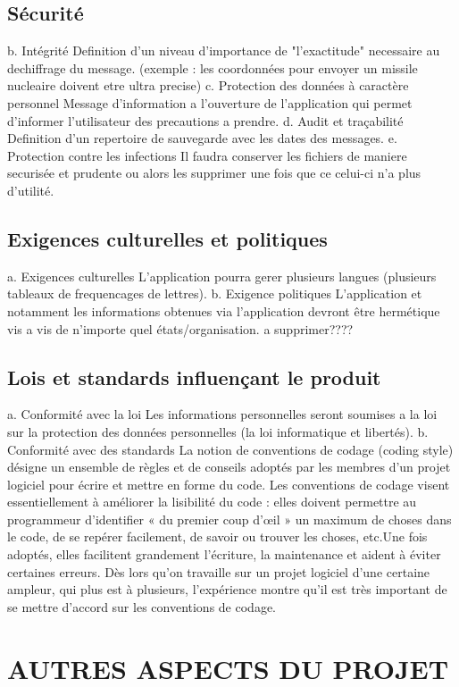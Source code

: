 \documentclass[a4]{article}
\begin{document}
		\subsection{Sécurité}
			b. Intégrité
Definition d'un niveau d'importance de "l'exactitude" necessaire au dechiffrage du message.
(exemple : les coordonnées pour envoyer un missile nucleaire doivent etre ultra precise)
			c. Protection des données à caractère personnel
Message d'information a l'ouverture de l'application qui permet d'informer l'utilisateur des precautions a prendre.
			d. Audit et traçabilité
Definition d'un repertoire de sauvegarde avec les dates des messages.
			e. Protection contre les infections
Il faudra conserver les fichiers de maniere securisée et prudente ou alors les supprimer une fois que ce celui-ci n'a plus d'utilité.
		\subsection{Exigences culturelles et politiques}
			a. Exigences culturelles
L'application pourra gerer plusieurs langues (plusieurs tableaux de frequencages de lettres).
			b. Exigence politiques
L'application et notamment les informations obtenues via l'application devront être hermétique vis a vis de n'importe quel états/organisation. a supprimer????
		\subsection{Lois et standards influençant le produit}
		a. Conformité avec la loi
Les informations personnelles seront soumises a la loi sur la protection des données
personnelles (la loi informatique et libertés).
		b. Conformité avec des standards
La notion de conventions de codage (coding style) désigne un ensemble de règles et de conseils 
adoptés par les membres d’un projet logiciel pour écrire et mettre en forme du code.
Les conventions de codage visent essentiellement à améliorer la lisibilité du code : elles doivent 
permettre au programmeur d’identifier « du premier coup d’œil » un maximum de choses dans 
le  code, de se repérer facilement, de savoir ou trouver les choses, etc.Une fois adoptés, elles
facilitent grandement l’écriture, la maintenance et aident à éviter certaines erreurs.
Dès lors qu’on travaille sur un projet logiciel d’une certaine ampleur, qui plus est à
plusieurs, l’expérience montre qu’il est très important de se mettre d’accord sur les
conventions de codage.	\section{AUTRES ASPECTS DU PROJET}
\end{document}
